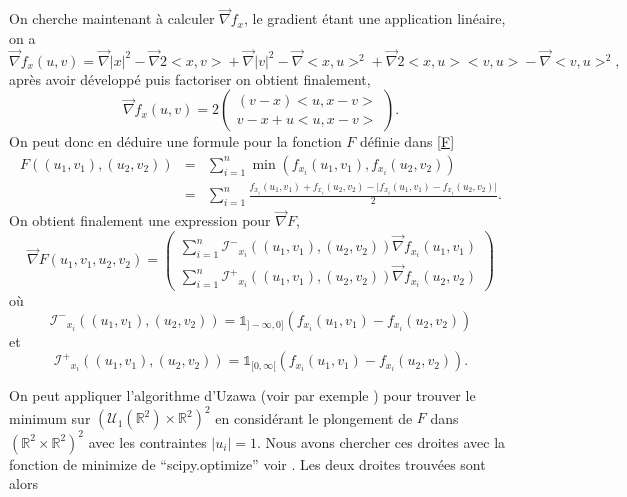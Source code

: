 \documentclass[a4paper,10pt]{article}
\begin{document}
On cherche maintenant à calculer $\overrightarrow{\nabla} f_x$, le gradient étant une application linéaire, on a  
\[\overrightarrow{\nabla} f_x (u,v)= \overrightarrow{\nabla}\big|x\big|^2-\overrightarrow{\nabla}2\big<x,v\big>+\overrightarrow{\nabla}\big|v\big|^2 -\overrightarrow{\nabla}\big<x, u\big>^2+ \overrightarrow{\nabla}2\big<x, u\big>\big<v, u\big>- \overrightarrow{\nabla}\big<v, u\big>^2,\]
après avoir développé puis factoriser on obtient finalement, 
\begin{equation}
	\overrightarrow{\nabla} f_x (u,v)=2
	\begin{pmatrix}
		(v-x)\big<u,x-v\big>\\
		v-x+u\big<u,x-v\big>
	\end{pmatrix}.
\end{equation}
On peut donc en déduire une formule pour la fonction $F$ définie dans \eqref{F}
\begin{equation}
	\begin{array}{ccc}
		F((u_1,v_1), (u_2,v_2))&=& \sum_{i=1}^{n}\min (f_{x_i}(u_1,v_1) ,f_{x_i}(u_2,v_2) )\\
		&=& \sum_{i=1}^{n} \frac{f_{x_i}(u_1,v_1)+f_{x_i}(u_2,v_2) -\big|f_{x_i}(u_1,v_1)- f_{x_i}(u_2,v_2) \big| }{2}.
	\end{array}
\end{equation}
On obtient finalement une expression pour $\overrightarrow{\nabla} F$, 
\begin{equation}
	\overrightarrow{\nabla} F(u_1,v_1, u_2,v_2)=
	\begin{pmatrix}
		\sum_{i=1}^{n}\mathcal{I^{-}}_{x_i}((u_1,v_1),(u_2,v_2))\overrightarrow{\nabla}f_{x_i} (u_1,v_1)\\
		\sum_{i=1}^{n}\mathcal{I^{+}}_{x_i}((u_1,v_1),(u_2,v_2))\overrightarrow{\nabla}f_{x_i} (u_2,v_2)
	\end{pmatrix}
\end{equation}
où \[\mathcal{I^{-}}_{x_i}((u_1,v_1),(u_2,v_2))=\mathds{1}_{]-\infty,0]}(f_{x_i}(u_1,v_1)- f_{x_i}(u_2,v_2))\] et \[\mathcal{I^{+}}_{x_i}((u_1,v_1),(u_2,v_2))=\mathds{1}_{[0,\infty[}(f_{x_i}(u_1,v_1)- f_{x_i}(u_2,v_2)).\]

On peut appliquer l'algorithme d'Uzawa (voir par exemple \cite{boyd2004convex}) pour trouver le minimum sur  $(\mathcal{U}_1(\mathbb{R}^2)\times\mathbb{R}^2)^2$ en considérant le plongement de $F$ dans  $(\mathbb{R}^2\times\mathbb{R}^2)^2$ avec les contraintes $|u_i|=1$. Nous avons chercher ces droites avec la fonction de minimize de ``scipy.optimize'' voir \cite{scipy}. Les deux droites trouvées sont alors 
\end{document}
